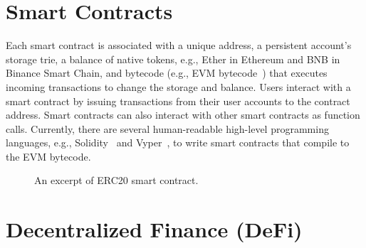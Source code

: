 \section{Smart Contracts} 
Each smart contract is associated with a unique address, a
persistent account's storage trie, a balance of native tokens, e.g., Ether in
Ethereum and BNB in Binance Smart Chain, and bytecode (e.g., EVM
bytecode~\cite{ethereum22,buterin2014ethereum}) that executes incoming
transactions to change the storage and balance. Users interact with a smart
contract by issuing transactions from their user accounts to the contract
address. 
Smart contracts can also interact with other smart contracts as function calls.
Currently, there are several human-readable high-level programming languages,
e.g., Solidity~\cite{solidity} and Vyper~\cite{vyper}, to write smart contracts
that compile to the EVM bytecode. 


\begin{figure}[t]
    \centering
    \begin{minipage}[h]{0.9\linewidth}
    
    \end{minipage}
    \caption{An excerpt of ERC20 smart contract.}
    \label{fig:ERC20}
    \vspace{-2mm}
\end{figure}




\section{Decentralized Finance (DeFi)}

